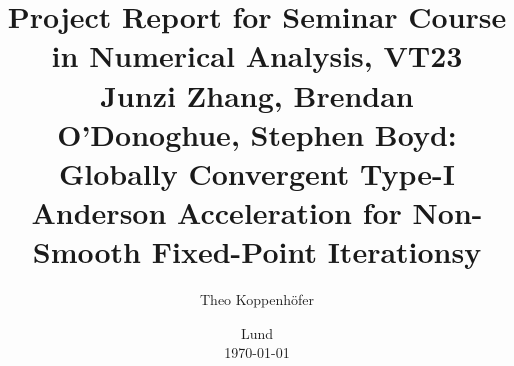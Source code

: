 




\title{ Project Report for Seminar Course in Numerical Analysis, VT23 \\[1ex]
	  \large Junzi Zhang, Brendan O'Donoghue, Stephen Boyd: Globally Convergent Type-I Anderson Acceleration for Non-Smooth Fixed-Point Iterationsy}
\author{Theo Koppenhöfer}
\date{Lund \\[1ex] \today}






\maketitle



